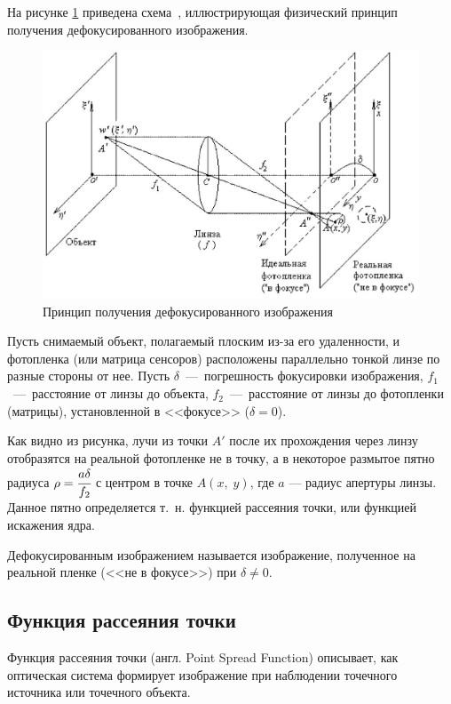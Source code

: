 На рисунке \ref{schema} приведена схема~\cite{scheme}, иллюстрирующая физический принцип получения дефокусированного изображения.

\begin{figure}[H]
	\centering
	\includegraphics[scale=0.55]{assets/schema}
	\caption{Принцип получения дефокусированного изображения}
	\label{schema}
\end{figure}

Пусть снимаемый объект, полагаемый плоским из-за его удаленности, и фотопленка (или матрица сенсоров) расположены параллельно тонкой линзе по разные стороны от нее. Пусть $\delta$~---~погрешность фокусировки изображения, $f_1$~---~расстояние от линзы до объекта, $f_2$~---~расстояние от линзы до фотопленки (матрицы), установленной в <<фокусе>> ($\delta = 0$).

Как видно из рисунка, лучи из точки $A'$ после их прохождения через линзу отобразятся на реальной фотопленке не в точку, а в некоторое размытое пятно радиуса $\rho = \cfrac{a\delta}{f_2}$ с центром в точке $A(x,\;y)$, где $a$ --- радиус апертуры линзы. Данное пятно определяется т.~н. функцией рассеяния точки, или функцией искажения ядра.

Дефокусированным изображением называется изображение, полученное на реальной пленке (<<не в фокусе>>) при $\delta \neq 0$.

\clearpage

\subsection{Функция рассеяния точки}

Функция рассеяния точки (англ. Point Spread Function) описывает, как оптическая система формирует изображение при наблюдении точечного источника или точечного объекта.

